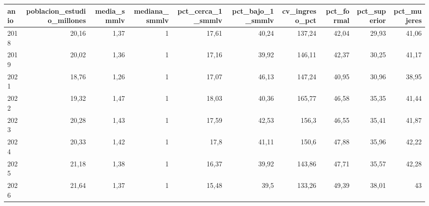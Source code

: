\begin{tabular}{lrrrrrrrrr}
\toprule
anio & poblacion\_estudio\_millones & media\_smmlv & mediana\_smmlv & pct\_cerca\_1\_smmlv & pct\_bajo\_1\_smmlv & cv\_ingreso\_pct & pct\_formal & pct\_superior & pct\_mujeres \\
\midrule
2018 & 20,16 & 1,37 & 1 & 17,61 & 40,24 & 137,24 & 42,04 & 29,93 & 41,06 \\
2019 & 20,02 & 1,36 & 1 & 17,16 & 39,92 & 146,11 & 42,37 & 30,25 & 41,17 \\
2021 & 18,76 & 1,26 & 1 & 17,07 & 46,13 & 147,24 & 40,95 & 30,96 & 38,95 \\
2022 & 19,32 & 1,47 & 1 & 18,03 & 40,36 & 165,77 & 46,58 & 35,35 & 41,44 \\
2023 & 20,28 & 1,43 & 1 & 17,59 & 42,53 & 156,3 & 46,55 & 35,41 & 41,87 \\
2024 & 20,33 & 1,42 & 1 & 17,8 & 41,11 & 150,6 & 47,88 & 35,96 & 42,22 \\
2025 & 21,18 & 1,38 & 1 & 16,37 & 39,92 & 143,86 & 47,71 & 35,57 & 42,28 \\
2026 & 21,64 & 1,37 & 1 & 15,48 & 39,5 & 133,26 & 49,39 & 38,01 & 43 \\
\bottomrule
\end{tabular}
